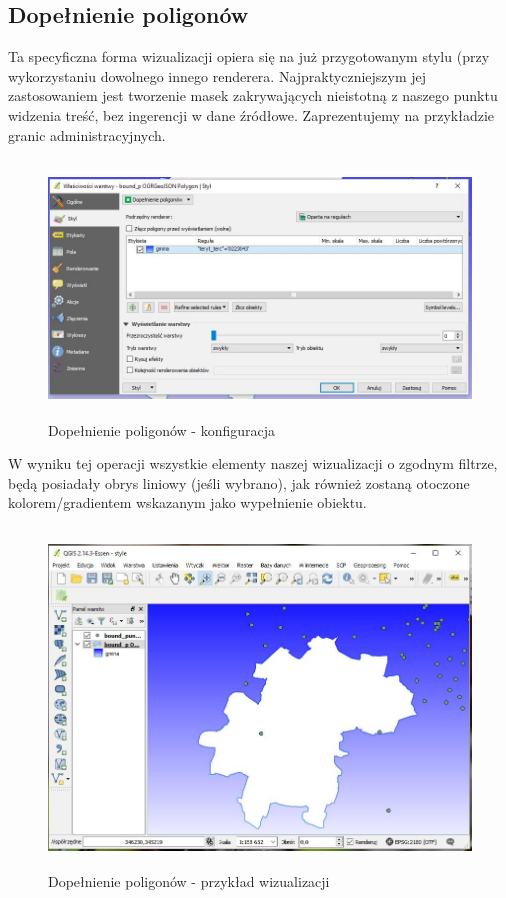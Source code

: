 \documentclass[12pt,a4paper]{book}
\begin{document}
\subsection{Dopełnienie poligonów}
Ta specyficzna forma wizualizacji opiera się na już przygotowanym stylu (przy wykorzystaniu dowolnego innego renderera. Najpraktyczniejszym jej zastosowaniem jest tworzenie masek zakrywających nieistotną z naszego punktu widzenia treść, bez ingerencji w dane źródłowe. Zaprezentujemy na przykładzie granic administracyjnych.



\begin{center}
\begin{figure}
\includegraphics[width=13cm,height=6.798cm]{007-dopelnienie-konf.jpg}
\caption{Dopełnienie poligonów - konfiguracja}
\end{figure}
\end{center}
W wyniku tej operacji wszystkie elementy naszej wizualizacji o zgodnym filtrze, będą posiadały obrys liniowy (jeśli wybrano), jak również zostaną otoczone kolorem/gradientem wskazanym jako wypełnienie obiektu.

\begin{figure}[ht]
	\centering
	\includegraphics[height=9.0cm]{007-dopelnienie-wiz.jpg}
	\caption{Dopełnienie poligonów - przykład wizualizacji}
\end{figure}
\end{document}
